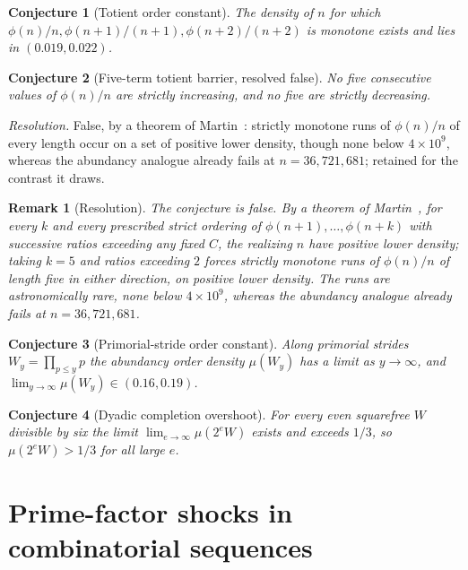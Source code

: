 \documentclass[11pt]{article}
\newtheorem{conjecture}{Conjecture}
\newtheorem{remark}{Remark}
\theoremstyle{definition}
\begin{document}
\begin{conjecture}[Totient order constant]\label{w10}
The density of $n$ for which $\phi(n)/n,\phi(n+1)/(n+1),\phi(n+2)/(n+2)$ is monotone exists and lies in $(0.019,0.022)$.
\end{conjecture}

\begin{conjecture}[Five-term totient barrier, resolved false]\label{w11}
No five consecutive values of $\phi(n)/n$ are strictly increasing, and no five are strictly decreasing.
\end{conjecture}

\emph{Resolution.} False, by a theorem of Martin~\cite{Martin06}: strictly monotone runs of $\phi(n)/n$ of every length occur on a set of positive lower density, though none below $4\times10^9$, whereas the abundancy analogue already fails at $n=36{,}721{,}681$; retained for the contrast it draws.

\begin{remark}[Resolution]
The conjecture is false.  By a theorem of Martin~\cite{Martin06}, for every $k$ and every prescribed strict ordering of $\phi(n+1),\ldots,\phi(n+k)$ with successive ratios exceeding any fixed $C$, the realizing $n$ have positive lower density; taking $k=5$ and ratios exceeding $2$ forces strictly monotone runs of $\phi(n)/n$ of length five in either direction, on positive lower density.  The runs are astronomically rare, none below $4\times10^9$, whereas the abundancy analogue already fails at $n=36{,}721{,}681$.
\end{remark}

\begin{conjecture}[Primorial-stride order constant]\label{w12}
Along primorial strides $W_y=\prod_{p\le y}p$ the abundancy order density $\mu(W_y)$ has a limit as $y\to\infty$, and $\lim_{y\to\infty}\mu(W_y)\in(0.16,0.19)$.
\end{conjecture}

\begin{conjecture}[Dyadic completion overshoot]\label{w13}
For every even squarefree $W$ divisible by six the limit $\lim_{e\to\infty}\mu(2^eW)$ exists and exceeds $1/3$, so $\mu(2^eW)>1/3$ for all large $e$.
\end{conjecture}

\section{Prime-factor shocks in combinatorial sequences}
\end{document}
